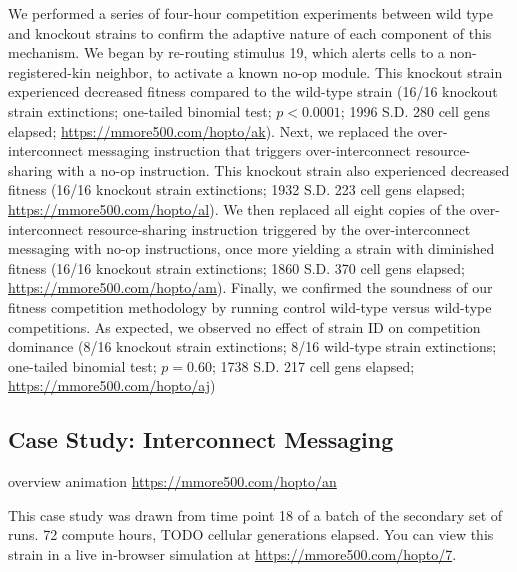 We performed a series of four-hour competition experiments between wild type and knockout strains to confirm the adaptive nature of each component of this mechanism.
We began by re-routing stimulus 19, which alerts cells to a non-registered-kin neighbor, to activate a known no-op module.
This knockout strain experienced decreased fitness compared to the wild-type strain (16/16 knockout strain extinctions; one-tailed binomial test; $p < 0.0001$; 1996 S.D. 280 cell gens elapsed; \url{https://mmore500.com/hopto/ak}).
Next, we replaced the over-interconnect messaging instruction that triggers over-interconnect resource-sharing with a no-op instruction.
This knockout strain also experienced decreased fitness (16/16 knockout strain extinctions; 1932 S.D. 223 cell gens elapsed; \url{https://mmore500.com/hopto/al}).
We then replaced all eight copies of the over-interconnect resource-sharing instruction triggered by the over-interconnect messaging with no-op instructions, once more yielding a strain with diminished fitness (16/16 knockout strain extinctions; 1860 S.D. 370 cell gens elapsed; \url{https://mmore500.com/hopto/am}).
Finally, we confirmed the soundness of our fitness competition methodology by running control wild-type versus wild-type competitions.
As expected, we observed no effect of strain ID on competition dominance (8/16 knockout strain extinctions; 8/16 wild-type strain extinctions; one-tailed binomial test; $p = 0.60$; 1738 S.D. 217 cell gens elapsed; \url{https://mmore500.com/hopto/aj})

\subsection{Case Study: Interconnect Messaging}



overview animation \url{https://mmore500.com/hopto/an}

This case study was drawn from time point 18 of a batch of the secondary set of runs.
72 compute hours, TODO cellular generations elapsed.
You can view this strain in a live in-browser simulation at \url{https://mmore500.com/hopto/7}.


